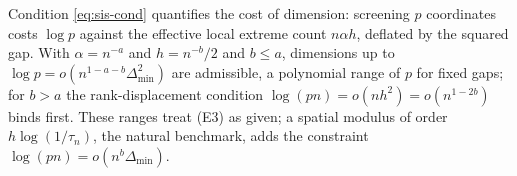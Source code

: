Condition \eqref{eq:sis-cond} quantifies the cost of dimension:
screening $p$ coordinates costs $\log p$ against the effective local
extreme count $n\alpha h$, deflated by the squared gap. With
$\alpha=n^{-a}$ and $h=n^{-b}/2$ and $b\le a$, dimensions up to
$\log p=o(n^{1-a-b}\Delta_{\min}^2)$ are admissible, a polynomial range
of $p$ for fixed gaps; for $b>a$ the rank-displacement condition
$\log(pn)=o(nh^2)=o(n^{1-2b})$ binds first. These ranges treat (E3) as given; a spatial modulus of order
$h\log(1/\tau_n)$, the natural benchmark, adds the constraint
$\log(pn)=o(n^{b}\Delta_{\min})$.

